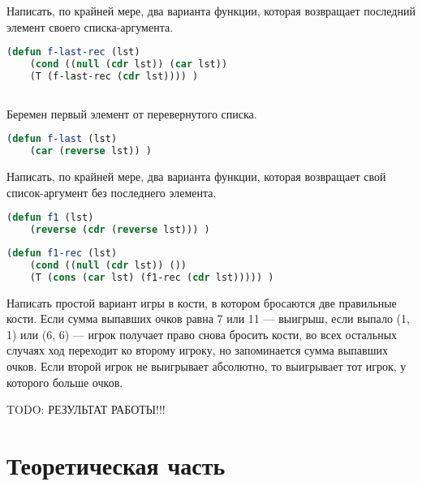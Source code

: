 \documentclass[a4paper,oneside,12pt]{extreport}
\begin{document}
\begin{task}
	Написать, по крайней мере, два варианта функции, которая возвращает последний элемент своего списка-аргумента.

	\begin{lstlisting}[language=Lisp]
(defun f-last-rec (lst)
	(cond ((null (cdr lst)) (car lst))
	(T (f-last-rec (cdr lst)))) )
	
	\end{lstlisting}

Беремен первый элемент от перевернутого списка.
	\begin{lstlisting}[language=Lisp]
(defun f-last (lst)
	(car (reverse lst)) )
	\end{lstlisting}
\end{task}

\begin{task}
	Написать, по крайней мере, два варианта функции, которая возвращает свой список-аргумент без последнего элемента.

	\begin{lstlisting}[language=Lisp]
(defun f1 (lst)
	(reverse (cdr (reverse lst))) )
	\end{lstlisting}
	
	\vspace*{4.5em plus .6em minus .5em}

	\begin{lstlisting}[language=Lisp]
(defun f1-rec (lst)
	(cond ((null (cdr lst)) ())
	(T (cons (car lst) (f1-rec (cdr lst))))) )
	\end{lstlisting}
\end{task}

\begin{task}
	Написать простой вариант игры в кости, в котором бросаются две правильные кости.
	Если сумма выпавших очков равна 7 или 11 — выигрыш, если выпало (1, 1) или (6, 6) — игрок получает право снова бросить кости, во всех остальных случаях ход переходит ко второму игроку, но запоминается сумма выпавших очков.
	Если второй игрок не выигрывает абсолютно, то выигрывает тот игрок, у которого больше очков.

	TODO: РЕЗУЛЬТАТ РАБОТЫ!!!
\end{task}



\newpage

\section*{Теоретическая часть}
\end{document}
